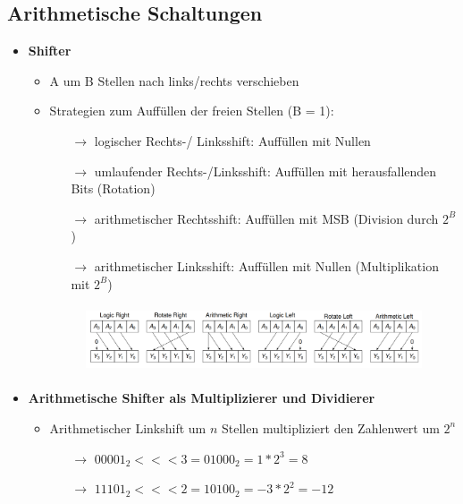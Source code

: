 \documentclass[11pt,a4paper]{article}
\begin{document}
\subsection{Arithmetische Schaltungen}
\begin{itemize}

\item \textbf{Shifter}
	\begin{itemize}
	\item A um B Stellen nach links/rechts verschieben
	\item Strategien zum Auffüllen der freien Stellen (B = 1):
		\begin{itemize}
		\item[$\rightarrow$] logischer Rechts-/ Linksshift: Auffüllen mit Nullen
		\item[$\rightarrow$] umlaufender Rechts-/Linksshift: Auffüllen mit herausfallenden Bits (Rotation)
		\item[$\rightarrow$] arithmetischer Rechtsshift: Auffüllen mit MSB (Division durch $2^B$)
		\item[$\rightarrow$] arithmetischer Linksshift: Auffüllen mit Nullen (Multiplikation mit $2^B$)
		\end{itemize}
	\item[]
		\begin{figure}[H]
			\begin{center}
			\includegraphics[height=2cm]{Bilder/shifter1}
			\end{center}
		\end{figure}
	\end{itemize}
	
\pagebreak	
	
\item \textbf{Arithmetische Shifter als Multiplizierer und Dividierer}
	\begin{itemize}
	\item Arithmetischer Linkshift um $n$ Stellen multipliziert den Zahlenwert um $2^n$
		\begin{itemize}
		\item[$\rightarrow$] $00001_2 <<< 3 = 01000_2 = 1 * 2^3 = 8$
		\item[$\rightarrow$] $11101_2 <<< 2 = 10100_2 = -3 * 2^2 = -12$
		\end{itemize}
	

\end{itemize}
\end{itemize}
\end{document}
